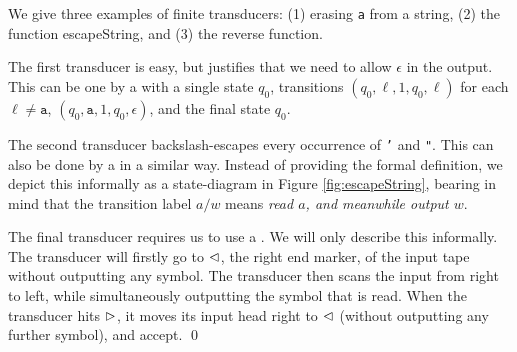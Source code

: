 \begin{example}
    We give three examples of finite transducers: (1) erasing \texttt{a} from
    a string, (2) the function escapeString, and (3) the reverse function.

    The first transducer is easy, but justifies that we need to allow $\epsilon$
    in the output. 
    This can be one by a \FT{} with a single state $q_0$,
    transitions 
    $(q_0, \ell, 1, q_0, \ell)$ for each $\ell \neq \texttt{a}$, 
    $(q_0,\texttt{a}, 1, q_0, \epsilon)$, 
    and the final state $q_0$.

    The second transducer backslash-escapes every occurrence of \texttt{'} and 
    \texttt{"}. This can also be done by a \FT{} in a similar way. Instead of
    providing the formal definition, we depict this informally as a 
    state-diagram in Figure
    \ref{fig:escapeString}, bearing in mind that 
     the transition label
    $a/w$ means \emph{read $a$, and meanwhile output $w$}.



    The final transducer requires us to use a \FFT{}. We will only describe
    this informally. The transducer will firstly go to $\vartriangleleft$, the right end marker, of the input tape
    without outputting any symbol. The transducer then scans the input from
    right to left, while simultaneously outputting the symbol that is read.
    When the transducer hits $\vartriangleright$, it moves its input head right to $\vartriangleleft$ (without outputting any further symbol), and accept.
    \qed
\end{example}


